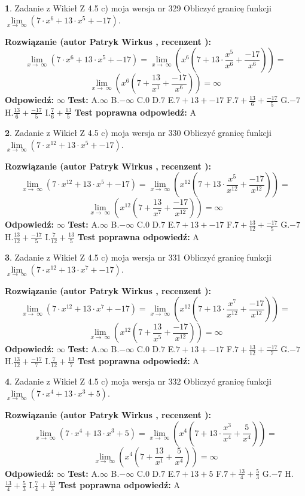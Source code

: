 \documentclass[12pt, a4paper]{article}
\theoremstyle{definition} %
\newtheorem{zad}{}
\newcommand{\zadStart}[1]{\begin{zad}#1\newline}
\newcommand{\zadStop}{\end{zad}}
\newcommand{\rozwStart}[2]{\noindent \textbf{Rozwiązanie (autor #1 , recenzent #2): }\newline}
\newcommand{\rozwStop}{\newline}
\newcommand{\odpStart}{\noindent \textbf{Odpowiedź:}\newline}
\newcommand{\odpStop}{\newline}
\newcommand{\testStart}{\noindent \textbf{Test:}\newline}
\newcommand{\testStop}{\newline}
\newcommand{\kluczStart}{\noindent \textbf{Test poprawna odpowiedź:}\newline}
\newcommand{\kluczStop}{\newline}
\begin{document}
\zadStart{Zadanie z Wikieł Z 4.5 c) moja wersja nr 329}
Obliczyć granicę funkcji  $\lim\limits_{x\to\ \infty}(7 \cdot x^{6}+13 \cdot x^{5}+-17)$.
\zadStop
\rozwStart{Patryk Wirkus}{}
$$\lim\limits_{x\to\ \infty}(7 \cdot x^{6}+13 \cdot x^{5}+-17) = \lim\limits_{x\to\ \infty}(x^{6}(7 +13 \cdot \frac{x^{5}}{x^{6}}+\frac{-17}{x^{6}})) =$$ $$\lim\limits_{x\to\ \infty}(x^{6}(7 +\frac{13}{x^{1}}+\frac{-17}{x^{6}})) =\infty$$
\rozwStop
\odpStart
$\infty$
\odpStop
\testStart
A.$\infty$ B.$-\infty$ C.$0$ D.$7$ E.$7 + 13 + -17$
F.$7+\frac{13}{6}+\frac{-17}{5}$ G.$-7$
H.$\frac{13}{6}+\frac{-17}{5}$
I.$\frac{7}{6}+\frac{13}{5}$
\testStop
\kluczStart
A
\kluczStop



\zadStart{Zadanie z Wikieł Z 4.5 c) moja wersja nr 330}
Obliczyć granicę funkcji  $\lim\limits_{x\to\ \infty}(7 \cdot x^{12}+13 \cdot x^{5}+-17)$.
\zadStop
\rozwStart{Patryk Wirkus}{}
$$\lim\limits_{x\to\ \infty}(7 \cdot x^{12}+13 \cdot x^{5}+-17) = \lim\limits_{x\to\ \infty}(x^{12}(7 +13 \cdot \frac{x^{5}}{x^{12}}+\frac{-17}{x^{12}})) =$$ $$\lim\limits_{x\to\ \infty}(x^{12}(7 +\frac{13}{x^{7}}+\frac{-17}{x^{12}})) =\infty$$
\rozwStop
\odpStart
$\infty$
\odpStop
\testStart
A.$\infty$ B.$-\infty$ C.$0$ D.$7$ E.$7 + 13 + -17$
F.$7+\frac{13}{12}+\frac{-17}{5}$ G.$-7$
H.$\frac{13}{12}+\frac{-17}{5}$
I.$\frac{7}{12}+\frac{13}{5}$
\testStop
\kluczStart
A
\kluczStop



\zadStart{Zadanie z Wikieł Z 4.5 c) moja wersja nr 331}
Obliczyć granicę funkcji  $\lim\limits_{x\to\ \infty}(7 \cdot x^{12}+13 \cdot x^{7}+-17)$.
\zadStop
\rozwStart{Patryk Wirkus}{}
$$\lim\limits_{x\to\ \infty}(7 \cdot x^{12}+13 \cdot x^{7}+-17) = \lim\limits_{x\to\ \infty}(x^{12}(7 +13 \cdot \frac{x^{7}}{x^{12}}+\frac{-17}{x^{12}})) =$$ $$\lim\limits_{x\to\ \infty}(x^{12}(7 +\frac{13}{x^{5}}+\frac{-17}{x^{12}})) =\infty$$
\rozwStop
\odpStart
$\infty$
\odpStop
\testStart
A.$\infty$ B.$-\infty$ C.$0$ D.$7$ E.$7 + 13 + -17$
F.$7+\frac{13}{12}+\frac{-17}{7}$ G.$-7$
H.$\frac{13}{12}+\frac{-17}{7}$
I.$\frac{7}{12}+\frac{13}{7}$
\testStop
\kluczStart
A
\kluczStop



\zadStart{Zadanie z Wikieł Z 4.5 c) moja wersja nr 332}
Obliczyć granicę funkcji  $\lim\limits_{x\to\ \infty}(7 \cdot x^{4}+13 \cdot x^{3}+5)$.
\zadStop
\rozwStart{Patryk Wirkus}{}
$$\lim\limits_{x\to\ \infty}(7 \cdot x^{4}+13 \cdot x^{3}+5) = \lim\limits_{x\to\ \infty}(x^{4}(7 +13 \cdot \frac{x^{3}}{x^{4}}+\frac{5}{x^{4}})) =$$ $$\lim\limits_{x\to\ \infty}(x^{4}(7 +\frac{13}{x^{1}}+\frac{5}{x^{4}})) =\infty$$
\rozwStop
\odpStart
$\infty$
\odpStop
\testStart
A.$\infty$ B.$-\infty$ C.$0$ D.$7$ E.$7 + 13 + 5$
F.$7+\frac{13}{4}+\frac{5}{3}$ G.$-7$
H.$\frac{13}{4}+\frac{5}{3}$
I.$\frac{7}{4}+\frac{13}{3}$
\testStop
\kluczStart
A
\kluczStop
\end{document}

